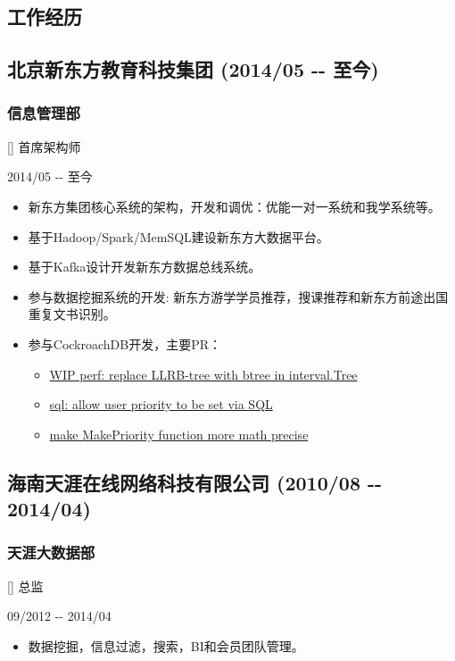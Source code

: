 \documentclass[a4paper]{article}
\newenvironment{DUlineblock}[1]{%
    \list{}{\setlength{\partopsep}{\parskip}
            \addtolength{\partopsep}{\baselineskip}
            \setlength{\topsep}{0pt}
            \setlength{\itemsep}{0.15\baselineskip}
            \setlength{\parsep}{0pt}
            \setlength{\leftmargin}{#1}}
    \raggedright
  }
  {\endlist}
\begin{document}
\begin{CJK}{UTF8}{gkai}
\section*{工作经历}
\subsection*{北京新东方教育科技集团 (2014/05 -{}- 至今)}
\subsubsection*{信息管理部}
\begin{DUlineblock}{0em}
\item[] 首席架构师
\item[] 2014/05 -{}- 至今
\end{DUlineblock}
\begin{itemize}
\item 新东方集团核心系统的架构，开发和调优：优能一对一系统和我学系统等。
\item 基于Hadoop/Spark/MemSQL建设新东方大数据平台。
\item 基于Kafka设计开发新东方数据总线系统。
\item 参与数据挖掘系统的开发: 新东方游学学员推荐，搜课推荐和新东方前途出国重复文书识别。
\item 参与CockroachDB开发，主要PR：
\begin{itemize}
  \item \href{https://github.com/cockroachdb/cockroach/pull/8867}{WIP perf: replace LLRB-tree with btree in interval.Tree}
  \item \href{https://github.com/cockroachdb/cockroach/pull/3912}{sql: allow user priority to be set via SQL}
  \item \href{https://github.com/cockroachdb/cockroach/pull/3783}{make MakePriority function more math precise}
\end{itemize}
\end{itemize}

\subsection*{海南天涯在线网络科技有限公司 (2010/08 -{}- 2014/04)}

\subsubsection*{天涯大数据部}
\begin{DUlineblock}{0em}
\item[] 总监
\item[] 09/2012 -{}- 2014/04
\end{DUlineblock}
\begin{itemize}
\item 数据挖掘，信息过滤，搜索，BI和会员团队管理。
\end{itemize}


\end{CJK}
\end{document}
